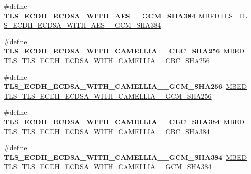 \begin{DoxyCompactItemize}
\item 
\mbox{\label{compat-1_83_8h_aef3dcb9d6fae59e0efb4d5dc4997f5c4}} 
\#define {\bfseries T\+L\+S\+\_\+\+E\+C\+D\+H\+\_\+\+E\+C\+D\+S\+A\+\_\+\+W\+I\+T\+H\+\_\+\+A\+E\+S\+\_\+\_\+\+G\+C\+M\+\_\+\+S\+H\+A384}~\mbox{\hyperlink{ssl__ciphersuites_8h_a6cfb6bc4832006215ea8b467a1dda6fd}{M\+B\+E\+D\+T\+L\+S\+\_\+\+T\+L\+S\+\_\+\+E\+C\+D\+H\+\_\+\+E\+C\+D\+S\+A\+\_\+\+W\+I\+T\+H\+\_\+\+A\+E\+S\+\_\+\_\+\+G\+C\+M\+\_\+\+S\+H\+A384}}
\item 
\mbox{\label{compat-1_83_8h_acefce8734244d373ca1009f7404fe273}} 
\#define {\bfseries T\+L\+S\+\_\+\+E\+C\+D\+H\+\_\+\+E\+C\+D\+S\+A\+\_\+\+W\+I\+T\+H\+\_\+\+C\+A\+M\+E\+L\+L\+I\+A\+\_\+\_\+\+C\+B\+C\+\_\+\+S\+H\+A256}~\mbox{\hyperlink{ssl__ciphersuites_8h_a6e5f28a18e10412eacac31a705348069}{M\+B\+E\+D\+T\+L\+S\+\_\+\+T\+L\+S\+\_\+\+E\+C\+D\+H\+\_\+\+E\+C\+D\+S\+A\+\_\+\+W\+I\+T\+H\+\_\+\+C\+A\+M\+E\+L\+L\+I\+A\+\_\+\_\+\+C\+B\+C\+\_\+\+S\+H\+A256}}
\item 
\mbox{\label{compat-1_83_8h_a96b67bac844e04c8c12d2ac8f4010c61}} 
\#define {\bfseries T\+L\+S\+\_\+\+E\+C\+D\+H\+\_\+\+E\+C\+D\+S\+A\+\_\+\+W\+I\+T\+H\+\_\+\+C\+A\+M\+E\+L\+L\+I\+A\+\_\+\_\+\+G\+C\+M\+\_\+\+S\+H\+A256}~\mbox{\hyperlink{ssl__ciphersuites_8h_a396ff66618161fdbab1b4b3b46d11ad9}{M\+B\+E\+D\+T\+L\+S\+\_\+\+T\+L\+S\+\_\+\+E\+C\+D\+H\+\_\+\+E\+C\+D\+S\+A\+\_\+\+W\+I\+T\+H\+\_\+\+C\+A\+M\+E\+L\+L\+I\+A\+\_\+\_\+\+G\+C\+M\+\_\+\+S\+H\+A256}}
\item 
\mbox{\label{compat-1_83_8h_ad511ab7db03c1ef915d254b102e5a398}} 
\#define {\bfseries T\+L\+S\+\_\+\+E\+C\+D\+H\+\_\+\+E\+C\+D\+S\+A\+\_\+\+W\+I\+T\+H\+\_\+\+C\+A\+M\+E\+L\+L\+I\+A\+\_\+\_\+\+C\+B\+C\+\_\+\+S\+H\+A384}~\mbox{\hyperlink{ssl__ciphersuites_8h_a6ca76006b0a2e6f4a9dfb3a6e0489f7a}{M\+B\+E\+D\+T\+L\+S\+\_\+\+T\+L\+S\+\_\+\+E\+C\+D\+H\+\_\+\+E\+C\+D\+S\+A\+\_\+\+W\+I\+T\+H\+\_\+\+C\+A\+M\+E\+L\+L\+I\+A\+\_\+\_\+\+C\+B\+C\+\_\+\+S\+H\+A384}}
\item 
\mbox{\label{compat-1_83_8h_a0d5990fc80d2940513b17c069e640c89}} 
\#define {\bfseries T\+L\+S\+\_\+\+E\+C\+D\+H\+\_\+\+E\+C\+D\+S\+A\+\_\+\+W\+I\+T\+H\+\_\+\+C\+A\+M\+E\+L\+L\+I\+A\+\_\+\_\+\+G\+C\+M\+\_\+\+S\+H\+A384}~\mbox{\hyperlink{ssl__ciphersuites_8h_a107ae7cee72c7cbf9b006d4e3e5eb223}{M\+B\+E\+D\+T\+L\+S\+\_\+\+T\+L\+S\+\_\+\+E\+C\+D\+H\+\_\+\+E\+C\+D\+S\+A\+\_\+\+W\+I\+T\+H\+\_\+\+C\+A\+M\+E\+L\+L\+I\+A\+\_\+\_\+\+G\+C\+M\+\_\+\+S\+H\+A384}}

\end{DoxyCompactItemize}
